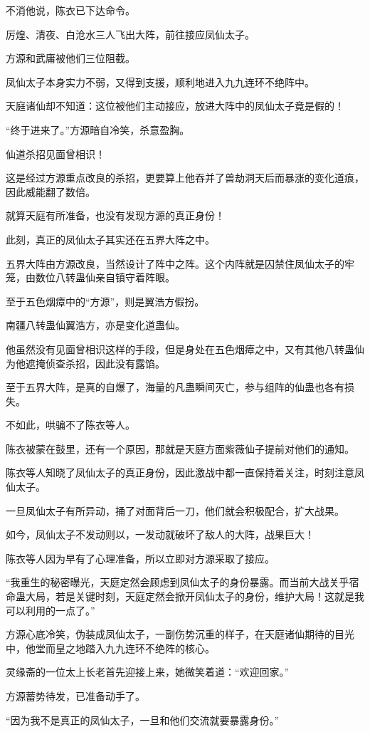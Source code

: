 \begin{this_body}
不消他说，陈衣已下达命令。

厉煌、清夜、白沧水三人飞出大阵，前往接应凤仙太子。

方源和武庸被他们三位阻截。

凤仙太子本身实力不弱，又得到支援，顺利地进入九九连环不绝阵中。

天庭诸仙却不知道：这位被他们主动接应，放进大阵中的凤仙太子竟是假的！

“终于进来了。”方源暗自冷笑，杀意盈胸。

仙道杀招见面曾相识！

这是经过方源重点改良的杀招，更要算上他吞并了兽劫洞天后而暴涨的变化道痕，因此威能翻了数倍。

就算天庭有所准备，也没有发现方源的真正身份！

此刻，真正的凤仙太子其实还在五界大阵之中。

五界大阵由方源改良，当然设计了阵中之阵。这个内阵就是囚禁住凤仙太子的牢笼，由数位八转蛊仙亲自镇守着阵眼。

至于五色烟瘴中的“方源”，则是翼浩方假扮。

南疆八转蛊仙翼浩方，亦是变化道蛊仙。

他虽然没有见面曾相识这样的手段，但是身处在五色烟瘴之中，又有其他八转蛊仙为他遮掩侦查杀招，因此没有露馅。

至于五界大阵，是真的自爆了，海量的凡蛊瞬间灭亡，参与组阵的仙蛊也各有损失。

不如此，哄骗不了陈衣等人。

陈衣被蒙在鼓里，还有一个原因，那就是天庭方面紫薇仙子提前对他们的通知。

陈衣等人知晓了凤仙太子的真正身份，因此激战中都一直保持着关注，时刻注意凤仙太子。

一旦凤仙太子有所异动，捅了对面背后一刀，他们就会积极配合，扩大战果。

如今，凤仙太子不发动则以，一发动就破坏了敌人的大阵，战果巨大！

陈衣等人因为早有了心理准备，所以立即对方源采取了接应。

“我重生的秘密曝光，天庭定然会顾虑到凤仙太子的身份暴露。而当前大战关乎宿命蛊大局，若是关键时刻，天庭定然会掀开凤仙太子的身份，维护大局！这就是我可以利用的一点了。”

方源心底冷笑，伪装成凤仙太子，一副伤势沉重的样子，在天庭诸仙期待的目光中，他堂而皇之地踏入九九连环不绝阵的核心。

灵缘斋的一位太上长老首先迎接上来，她微笑着道：“欢迎回家。”

方源蓄势待发，已准备动手了。

“因为我不是真正的凤仙太子，一旦和他们交流就要暴露身份。”


\end{this_body}
